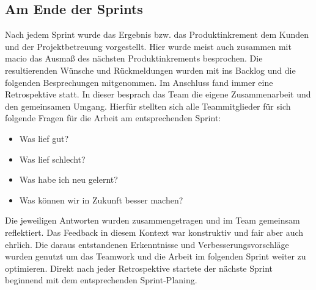 \documentclass[10pt, a4paper]{article}
\begin{document}
\begin{onehalfspace}
  \subsection{Am Ende der Sprints}
  Nach jedem Sprint wurde das Ergebnis bzw. das Produktinkrement dem Kunden und der Projektbetreuung vorgestellt.
  Hier wurde meist auch zusammen mit macio das Ausmaß des nächsten Produktinkrements besprochen.
  Die resultierenden Wünsche und Rückmeldungen wurden mit ins Backlog und die folgenden Besprechungen mitgenommen.
  Im Anschluss fand immer eine Retrospektive statt.
  In dieser besprach das Team die eigene Zusammenarbeit und den gemeinsamen Umgang.
  Hierfür stellten sich alle Teammitglieder für sich folgende Fragen für die Arbeit am entsprechenden Sprint:
  \begin{itemize}[noitemsep,topsep=0pt,parsep=0pt,partopsep=0pt]
    \item Was lief gut?
    \item Was lief schlecht?
    \item Was habe ich neu gelernt?
    \item Was können wir in Zukunft besser machen?
  \end{itemize}
  Die jeweiligen Antworten wurden zusammengetragen und im Team gemeinsam reflektiert.
  Das Feedback in diesem Kontext war konstruktiv und fair aber auch ehrlich.
  Die daraus entstandenen Erkenntnisse und Verbesserungsvorschläge wurden genutzt um das Teamwork und die Arbeit im folgenden Sprint weiter zu optimieren.
  Direkt nach jeder Retrospektive startete der nächste Sprint beginnend mit dem entsprechenden Sprint-Planing.


\end{onehalfspace}
\end{document}
